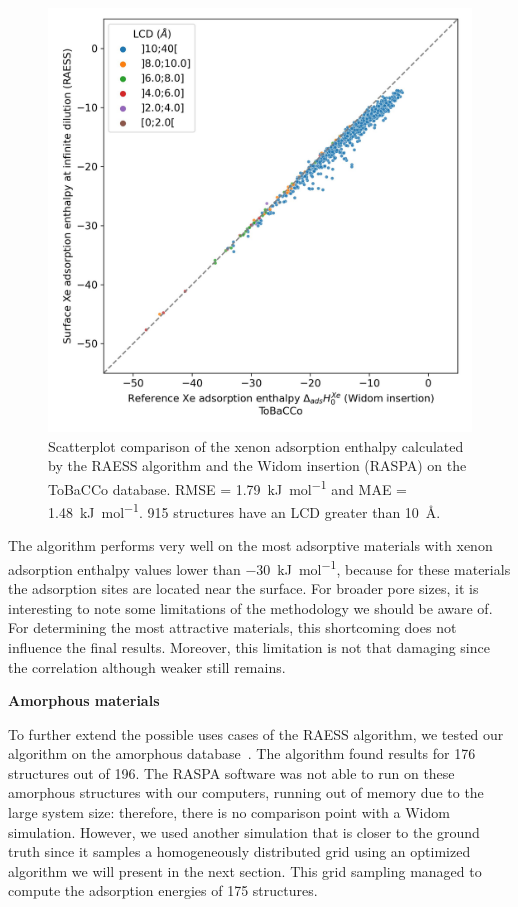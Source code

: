 \documentclass[main]{subfiles}
\begin{document}
\begin{figure}[ht]
\centering
  \includegraphics[width=0.5\linewidth]{figures/3-fastsim/H_Xe_0_widom_vs_Enthalpy_surface_kjmol_overview_tobacco.jpeg}
  \caption{Scatterplot comparison of the xenon adsorption enthalpy calculated by the RAESS algorithm and the Widom insertion (RASPA) on the ToBaCCo database. RMSE = \SI{1.79}{\kilo\joule\per\mole} and MAE = \SI{1.48}{\kilo\joule\per\mole}. 915 structures have an LCD greater than \SI{10}{\angstrom}.}\label{fgr:tobacco}
\end{figure}

The algorithm performs very well on the most adsorptive materials with xenon adsorption enthalpy values lower than \SI{-30}{\kilo\joule\per\mole}, because for these materials the adsorption sites are located near the surface. For broader pore sizes, it is interesting to note some limitations of the methodology we should be aware of. For determining the most attractive materials, this shortcoming does not influence the final results. Moreover, this limitation is not that damaging since the correlation although weaker still remains.


\textbf{Amorphous materials}

To further extend the possible uses cases of the RAESS algorithm, we tested our algorithm on the amorphous database~\autocite{Thyagarajan_2020}. The algorithm found results for 176 structures out of 196. The RASPA software was not able to run on these amorphous structures with our computers, running out of memory due to the large system size: therefore, there is no comparison point with a Widom simulation. However, we used another simulation that is closer to the ground truth since it samples a homogeneously distributed grid using an optimized algorithm we will present in the next section. This grid sampling managed to compute the adsorption energies of 175 structures. 
\end{document}

